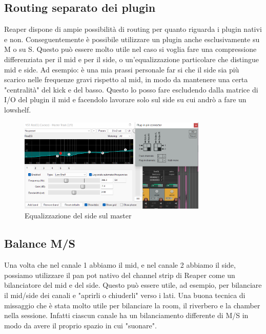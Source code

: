 \documentclass{article}
\begin{document}
    \subsection{Routing separato dei plugin}
    Reaper dispone di ampie possibilità di routing per quanto riguarda i plugin nativi e non. Conseguentemente è possibile utilizzare un plugin anche esclusivamente su M o su S.
    Questo può essere molto utile nel caso si voglia fare una compressione differenziata per il mid e per il side, o un'equalizzazione particolare che distingue mid e side.
    Ad esempio: è una mia prassi personale far si che il side sia più scarico nelle frequenze gravi rispetto al mid, in modo da mantenere una certa "centralità" del kick e del basso.
    Questo lo posso fare escludendo dalla matrice di I/O del plugin il mid e facendolo lavorare solo sul side su cui andrò a fare un lowshelf.

    \begin{figure}[H]
        \centering
        \includegraphics[width=0.8\textwidth]{images/sideeq.png}
         \caption{\label{fig10}Equalizzazione del side sul master}
    \end{figure}

   \subsection{Balance M/S}

   Una volta che nel canale 1 abbiamo il mid, e nel canale 2 abbiamo il side, possiamo utilizzare il pan pot nativo del channel strip di Reaper come un bilanciatore del mid e del side. Questo può essere utile, ad esempio, per bilanciare il mid/side dei canali e "aprirli o chiuderli" verso i lati. Una buona tecnica di missaggio che è stata molto utile per bilanciare la room, il riverbero e la chamber nella sessione. Infatti ciascun canale ha un bilanciamento differente di M/S in modo da avere il proprio spazio in cui "suonare".
\end{document}
